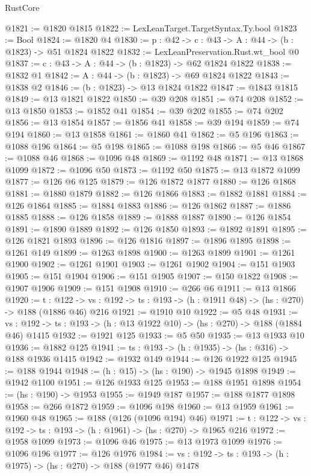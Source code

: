 \begin{lexlean}{RustCore}
\begin{coremodule}
@1821 := @1820 @1815
@1822 := LexLeanTarget.TargetSyntax.Ty.bool
@1823 := Bool
@1824 := @1820 @4
@1830 := {p : @42} -> {c : @43} -> {A : @44} -> (b : @1823) -> @51 @1824 @1822
@1832 := LexLeanPreservation.Rust.wt_bool @0
@1837 := {c : @43} -> {A : @44} -> (b : @1823) -> @62 @1824 @1822
@1838 := @1832 @1
@1842 := {A : @44} -> (b : @1823) -> @69 @1824 @1822
@1843 := @1838 @2
@1846 := (b : @1823) -> @13 @1824 @1822
@1847 := @1843 @1815
@1849 := @13 @1821 @1822
@1850 := @39 @208
@1851 := @74 @208
@1852 := @13 @1850
@1853 := @1852 @41
@1854 := @39 @202
@1855 := @74 @202
@1856 := @13 @1854
@1857 := @1856 @41
@1858 := @39 @194
@1859 := @74 @194
@1860 := @13 @1858
@1861 := @1860 @41
@1862 := @5 @196
@1863 := @1088 @196
@1864 := @5 @198
@1865 := @1088 @198
@1866 := @5 @46
@1867 := @1088 @46
@1868 := @1096 @48
@1869 := @1192 @48
@1871 := @13 @1868 @1099
@1872 := @1096 @50
@1873 := @1192 @50
@1875 := @13 @1872 @1099
@1877 := @126 @6 @125
@1879 := @126 @1872 @1877
@1880 := @126 @1868
@1881 := @1880 @1879
@1882 := @126 @1866
@1883 := @1882 @1881
@1884 := @126 @1864
@1885 := @1884 @1883
@1886 := @126 @1862
@1887 := @1886 @1885
@1888 := @126 @1858
@1889 := @1888 @1887
@1890 := @126 @1854
@1891 := @1890 @1889
@1892 := @126 @1850
@1893 := @1892 @1891
@1895 := @126 @1821 @1893
@1896 := @126 @1816
@1897 := @1896 @1895
@1898 := @1261 @149
@1899 := @1263 @1898
@1900 := @1263 @1899
@1901 := @1261 @1900
@1902 := @1261 @1901
@1903 := @1261 @1902
@1904 := @151 @1903
@1905 := @151 @1904
@1906 := @151 @1905
@1907 := @150 @1822
@1908 := @1907 @1906
@1909 := @151 @1908
@1910 := @266 @6
@1911 := @13 @1866
@1920 := {t : @122} ->
  {vs : @192} -> {ts : @193} -> (h : @1911 @48) -> (hs : @270) -> @188 (@1886 @46) @216
@1921 := @1910 @10
@1922 := @5 @48
@1931 := {vs : @192} -> {ts : @193} -> (h : @13 @1922 @10) -> (hs : @270) -> @188 (@1884 @46) @1415
@1932 := @1921 @125
@1933 := @5 @50
@1935 := @13 @1933 @10
@1936 := @1882 @125
@1941 := {ts : @193} -> (h : @1935) -> (hs : @316) -> @188 @1936 @1415
@1942 := @1932 @149
@1944 := @126 @1922 @125
@1945 := @188 @1944
@1948 := (h : @15) -> (hs : @190) -> @1945 @1898
@1949 := @1942 @1100
@1951 := @126 @1933 @125
@1953 := @188 @1951 @1898
@1954 := (hs : @190) -> @1953
@1955 := @1949 @187
@1957 := @188 @1877 @1898
@1958 := @266 @1872
@1959 := @1096 @198
@1960 := @13 @1959
@1961 := @1960 @48
@1965 := @188 (@126 (@1096 @194) @46)
@1971 := {t : @122} -> {vs : @192} -> {ts : @193} -> (h : @1961) -> (hs : @270) -> @1965 @216
@1972 := @1958 @1099
@1973 := @1096 @46
@1975 := @13 @1973 @1099
@1976 := @1096 @196
@1977 := @126 @1976
@1984 := {vs : @192} -> {ts : @193} -> (h : @1975) -> (hs : @270) -> @188 (@1977 @46) @1478

\end{coremodule}
\end{lexlean}
